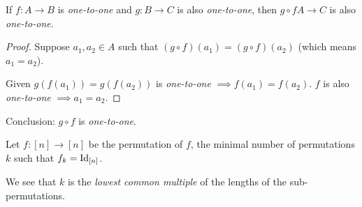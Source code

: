 \documentclass[00_complete]{subfiles}
\begin{document}
\begin{claim}
If $f: A \to B$ is \emph{one-to-one} and $g: B \to C$ is also
\emph{one-to-one}, then $g \circ f A \to C$ is also \emph{one-to-one}.
\end{claim}

\begin{proof}
Suppose $a_1, a_2 \in A$ such that $(g \circ f)(a_1)=(g \circ f)(a_2)$ (which
means $a_1=a_2$).

Given $g(f(a_1))=g(f(a_2))$ is \emph{one-to-one} $\implies f(a_1)=f(a_2)$. $f$
is also \emph{one-to-one} $\implies a_1=a_2$.
\end{proof}

\begin{conclusion}
Conclusion: $g \circ f$ is \emph{one-to-one}.
\end{conclusion}

\begin{definition}
Let $f: [n] \to [n]$ be the permutation of $f$, the minimal number of
permutations $k$ such that $f_k=\operatorname{Id}_{[n]}$.

We see that $k$ is the \emph{lowest common multiple} of the lengths of the
sub-permutations.
\end{definition}
\end{document}

